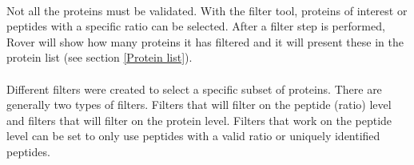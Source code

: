 \documentclass[11pt,a4paper,oneside,notitlepage]{book}
\begin{document}
\paragraph{}Not all the proteins must be validated. With the filter tool, proteins of interest or peptides with a specific ratio can be selected. After a filter step is performed, Rover will show how many proteins it has filtered and it will present these in the protein list (see section \ref{Protein list}).

\paragraph{}Different filters were created to select a specific subset of proteins. There are generally two types of filters. Filters that will filter on the peptide (ratio) level and filters that will filter on the protein level. Filters that work on the peptide level can be set to only use peptides with a valid ratio or uniquely identified peptides.
\end{document}
